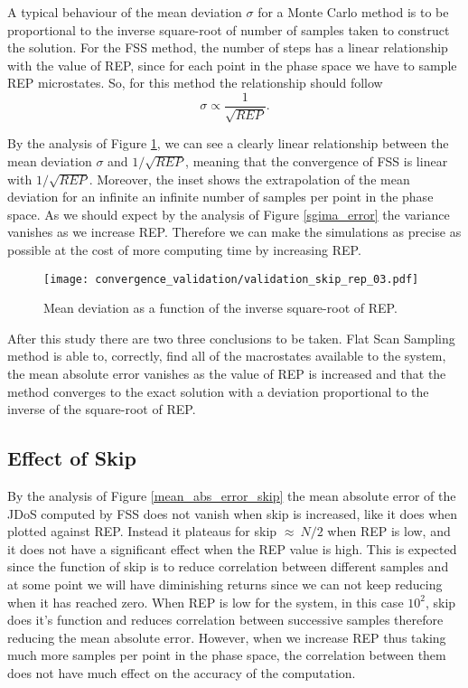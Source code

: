 	A typical behaviour of the mean deviation $\sigma$ for a Monte Carlo method is to be proportional to the inverse square-root of number of samples taken to construct the solution. For the FSS method, the number of steps has a linear relationship with the value of REP, since for each point in the phase space we have to sample REP microstates. So, for this method the relationship should follow 
\begin{equation}
	\sigma \propto \frac{1}{\sqrt{REP}}.
\end{equation}

	By the analysis of Figure \ref{sigma_rep}, we can see a clearly linear relationship between the mean deviation $\sigma$ and $1/\sqrt{REP}$, meaning that the convergence of FSS is linear with $1/\sqrt{REP}$. Moreover, the inset shows the extrapolation of the mean deviation for an infinite an infinite number of samples per point in the phase space. As we should expect by the analysis of Figure \ref{sgima_error} the variance vanishes as we increase REP. Therefore we can make the simulations as precise as possible at the cost of more computing time by increasing REP.
	
\begin{figure}[h]
	\centering
	\texttt{[image: convergence\_validation/validation\_skip\_rep\_03.pdf]}
	\caption{Mean deviation as a function of the inverse square-root of REP.}
	\label{sigma_rep}
\end{figure}

	After this study there are two three conclusions to be taken. Flat Scan Sampling method is able to, correctly, find all of the macrostates available to the system, the mean absolute error vanishes as the value of REP is increased and that the method converges to the exact solution with a deviation proportional to the inverse of the square-root of REP.

\subsection{Effect of Skip}

	By the analysis of Figure \ref{mean_abs_error_skip} the mean absolute error of the JDoS computed by FSS does not vanish when skip is increased, like it does when plotted against REP. Instead it plateaus for skip $\approx\ N/2$ when REP is low, and it does not have a significant effect when the REP value is high. This is expected since the function of skip is to reduce correlation between different samples and at some point we will have diminishing returns since we can not keep reducing when it has reached zero. 
When REP is low for the system, in this case $10^2$, skip does it's function and reduces correlation between successive samples therefore reducing the mean absolute error. 
However, when we increase REP thus taking much more samples per point in the phase space, the correlation between them does not have much effect on the accuracy of the computation. 

